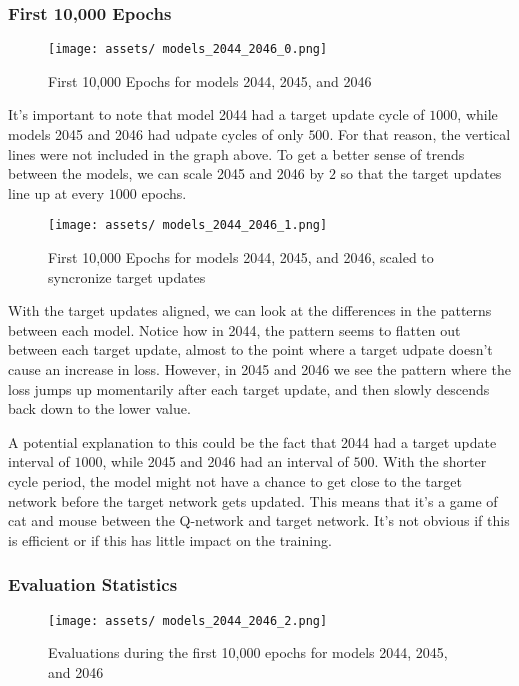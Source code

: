 \documentclass[12pt]{article}
\begin{document}
\newpage

\subsubsection{First 10,000 Epochs}


\begin{figure}[h]
	\centering
	\texttt{[image: assets/ models\_2044\_2046\_0.png]}
	\caption{First 10,000 Epochs for models 2044, 2045, and 2046}
\end{figure}

It's important to note that model 2044 had a target update cycle of $1000$, while models 2045 and 2046 had udpate cycles of only $500$. For that reason, the vertical lines were not included in the graph above. To get a better sense of trends between the models, we can scale 2045 and 2046 by $2$ so that the target updates line up at every $1000$ epochs.

\newpage

\begin{figure}[h]
	\centering
	\texttt{[image: assets/ models\_2044\_2046\_1.png]}
	\caption{First 10,000 Epochs for models 2044, 2045, and 2046, scaled to syncronize target updates}
\end{figure}

With the target updates aligned, we can look at the differences in the patterns between each model. Notice how in 2044, the pattern seems to flatten out between each target update, almost to the point where a target udpate doesn't cause an increase in loss. However, in 2045 and 2046 we see the pattern where the loss jumps up momentarily after each target update, and then slowly descends back down to the lower value.

A potential explanation to this could be the fact that 2044 had a target update interval of $1000$, while 2045 and 2046 had an interval of $500$. With the shorter cycle period, the model might not have a chance to get close to the target network before the target network gets updated. This means that it's a game of cat and mouse between the Q-network and target network. It's not obvious if this is efficient or if this has little impact on the training.

\newpage

\subsubsection{Evaluation Statistics}

\begin{figure}[h]
	\centering
	\texttt{[image: assets/ models\_2044\_2046\_2.png]}
	\caption{Evaluations during the first 10,000 epochs for models 2044, 2045, and 2046}
\end{figure}
\end{document}
